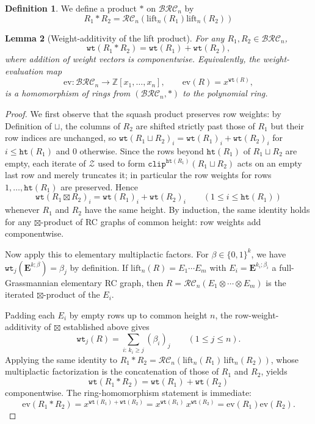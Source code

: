 \documentclass{amsart}
\newtheorem{lemma}{Lemma}[subsection]
\theoremstyle{definition}
\newtheorem{definition}[lemma]{Definition}
\theoremstyle{remark}
\numberwithin{equation}{subsection}
\newcommand{\wtt}{\mathtt{wt}}
\newcommand{\zeromap}{\mathcal{Z}}
\newcommand{\hr}{\mathtt{ht}}
\newcommand{\clp}{\mathtt{clip}}
\newcommand{\BRC}{\mathcal{BRC}}
\newcommand{\RC}{\mathcal{RC}}
\begin{document}
\begin{definition}
We define a product $*$ on $\BRC_n$ by
$$R_1*R_2 = \RC_n(\mathrm{lift}_n(R_1)\mathrm{lift}_n(R_2))$$
\end{definition}

\begin{lemma}[Weight-additivity of the lift product]\label{lemma:liftweight}
For any $R_1, R_2\in\BRC_n$,
$$\wtt(R_1 * R_2) = \wtt(R_1) + \wtt(R_2),$$
where addition of weight vectors is componentwise. Equivalently, the weight-evaluation map
$$\mathrm{ev}:\BRC_n\to\mathbb{Z}[x_1,\ldots,x_n],\qquad \mathrm{ev}(R) = x^{\wtt(R)},$$
is a homomorphism of rings from $(\BRC_n,*)$ to the polynomial ring.
\end{lemma}
\begin{proof}
We first observe that the squash product preserves row weights: by Definition of $\sqcup$, the columns of $R_2$ are shifted strictly past those of $R_1$ but their row indices are unchanged, so $\wtt(R_1\sqcup R_2)_i = \wtt(R_1)_i + \wtt(R_2)_i$ for $i\leq \hr(R_1)$ and $0$ otherwise. Since the rows beyond $\hr(R_1)$ of $R_1\sqcup R_2$ are empty, each iterate of $\zeromap$ used to form $\clp^{\hr(R_1)}(R_1\sqcup R_2)$ acts on an empty last row and merely truncates it; in particular the row weights for rows $1,\ldots,\hr(R_1)$ are preserved. Hence
$$\wtt(R_1\boxtimes R_2)_i = \wtt(R_1)_i + \wtt(R_2)_i\qquad (1\leq i\leq \hr(R_1))$$
whenever $R_1$ and $R_2$ have the same height. By induction, the same identity holds for any $\boxtimes$-product of RC graphs of common height: row weights add componentwise.

Now apply this to elementary multiplactic factors. For $\beta\in\{0,1\}^k$, we have $\wtt_j(\mathbf{E}^{k;\beta}) = \beta_j$ by definition. If $\mathrm{lift}_n(R) = E_1\cdots E_m$ with $E_i = \mathbf{E}^{k_i;\beta_i}$ a full-Grassmannian elementary RC graph, then $R = \RC_n(E_1\otimes\cdots\otimes E_m)$ is the iterated $\boxtimes$-product of the $E_i$.

Padding each $E_i$ by empty rows up to common height $n$, the row-weight-additivity of $\boxtimes$ established above gives
$$\wtt_j(R) = \sum_{i:\,k_i\geq j} (\beta_i)_j\qquad (1\leq j\leq n).$$
Applying the same identity to $R_1*R_2 = \RC_n(\mathrm{lift}_n(R_1)\,\mathrm{lift}_n(R_2))$, whose multiplactic factorization is the concatenation of those of $R_1$ and $R_2$, yields
$$\wtt(R_1*R_2) = \wtt(R_1) + \wtt(R_2)$$
componentwise. The ring-homomorphism statement is immediate:
$$\mathrm{ev}(R_1*R_2) = x^{\wtt(R_1)+\wtt(R_2)} = x^{\wtt(R_1)}\,x^{\wtt(R_2)} = \mathrm{ev}(R_1)\mathrm{ev}(R_2).$$
\end{proof}
\end{document}
